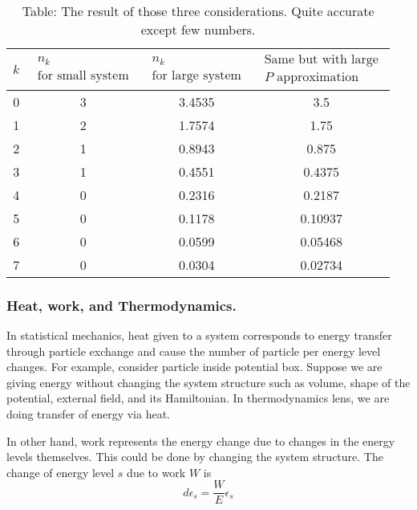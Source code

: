 \documentclass[../../../Main.tex]{subfiles}
\begin{document}
\begin{table}[h]
    \centering
    \caption*{Table: The result of those three considerations. Quite accurate except few numbers.}
    \begin{tabular}{cccc} 
        \toprule
        $k$&$\begin{array}{c}
            n_k\\
            \text{for small system}
        \end{array}$ &$\begin{array}{c}
            n_k\\
            \text{for large system}
        \end{array}$ &$\begin{array}{c}
            \text{Same but with large}\\
            P\text{ approximation}
        \end{array}$\\ 
        \midrule
        0 &3&3.4535&3.5 \\
        1 &2&1.7574&1.75 \\
        2 &1&0.8943&0.875 \\
        3 &1&0.4551&0.4375 \\
        4 &0&0.2316&0.2187 \\
        5 &0&0.1178&0.10937 \\
        6 &0&0.0599&0.05468 \\
        7 &0&0.0304&0.02734 \\
        \bottomrule
    \end{tabular}
\end{table}

\subsubsection{Heat, work, and Thermodynamics.} In statistical mechanics, heat given to a system corresponds to energy transfer through particle exchange and cause the number of particle per energy level changes. For example, consider particle inside potential box. Suppose we are giving energy without changing the system structure such as volume, shape of the potential, external field, and its Hamiltonian. In thermodynamics lens, we are doing transfer of energy via heat. 

In other hand, work represents the energy change due to changes in the energy levels themselves. This could be done by  changing the system structure. The change of energy level $s$ due to work $W$ is 
\begin{equation*}
    d\epsilon_s=\frac{W}{E}\epsilon_s
\end{equation*}
\end{document}
